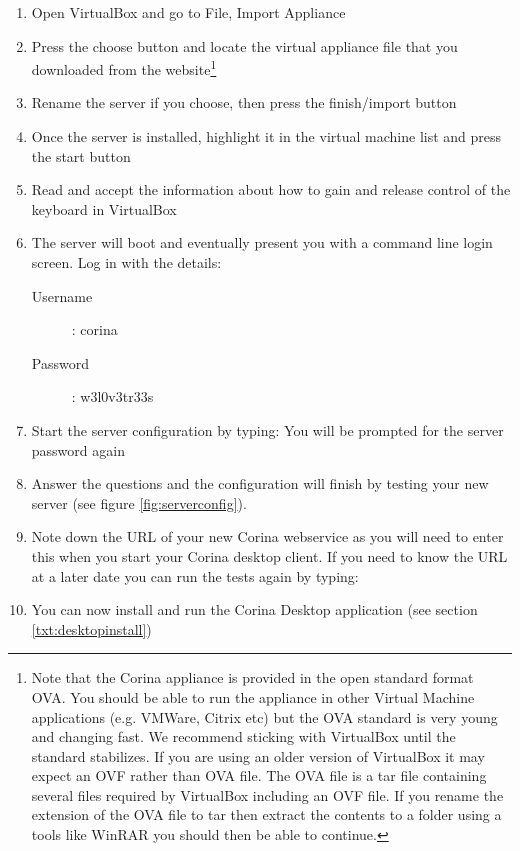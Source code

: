 \begin{enumerate}
 \item Open VirtualBox and go to File, Import Appliance
 \item Press the choose button and locate the virtual appliance file that you downloaded from the website\footnote{Note that the Corina appliance is provided in the open standard format OVA.  You should be able to run the appliance in other Virtual Machine applications (e.g. VMWare, Citrix etc) but the OVA standard is very young and changing fast.  We recommend sticking with VirtualBox until the standard stabilizes.  If you are using an older version of VirtualBox it may expect an OVF rather than OVA file.  The OVA file is a tar file containing several files required by VirtualBox including an OVF file.  If you rename the extension of the OVA file to tar then extract the contents to a folder using a tools like WinRAR you should then be able to continue.}
 \item Rename the server if you choose, then press the finish/import button
 \item Once the server is installed, highlight it in the virtual machine list and press the start button
 \item Read and accept the information about how to gain and release control of the keyboard in VirtualBox
 \item The server will boot and eventually present you with a command line login screen.  Log in with the details:
    \begin{description}
      \item[Username] : corina
      \item[Password] : w3l0v3tr33s
    \end{description}
 \item Start the server configuration by typing:  You will be prompted for the server password again
 \item Answer the questions and the configuration will finish by testing your new server (see figure \ref{fig:serverconfig}). 
 \item Note down the URL of your new Corina webservice as you will need to enter this when you start your Corina desktop client.  If you need to know the URL at a later date you can run the tests again by typing: 
 \item You can now install and run the Corina Desktop application (see section \ref{txt:desktopinstall})
\end{enumerate}


